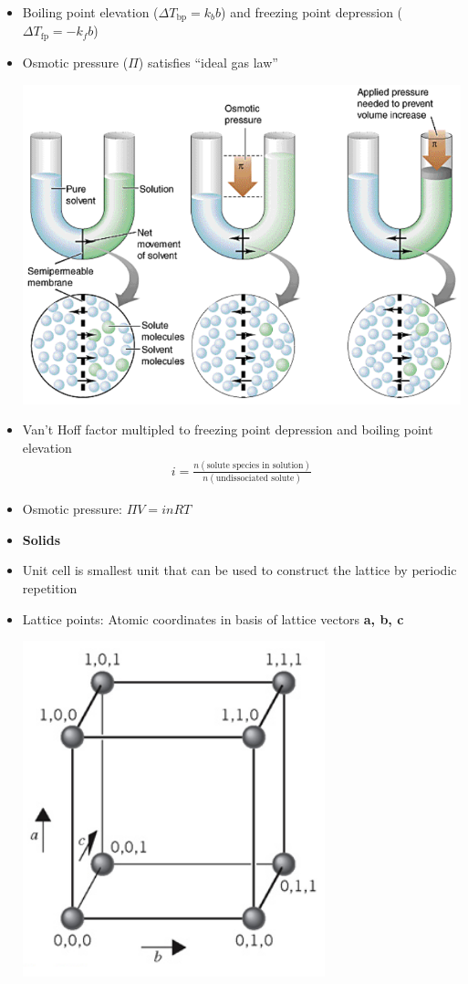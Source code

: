 \documentclass[11pt]{article}
\begin{document}
\begin{itemize}
\item Boiling point elevation ($\Delta T_\text{bp} = k_b b$) and freezing
  point depression ($\Delta T_\text{fp} = -k_fb$)
\item Osmotic pressure ($\Pi$) satisfies ``ideal gas law''
  \begin{center}
    \includegraphics[scale=0.4]{osmotic.png}
  \end{center}
\item Van't Hoff factor multipled to freezing point depression and
  boiling point elevation
  \begin{align*}
    i=\frac{n(\text{solute species in solution})}
    {n(\text{undissociated solute})}
  \end{align*}
\item Osmotic pressure: $\Pi V = inRT$
\item[] \textbf{Solids}
\item Unit cell is smallest unit that can be used to
  construct the lattice by periodic repetition
\item Lattice points: Atomic coordinates in basis
  of lattice vectors \textbf{a, b, c}
  \begin{center}
    \includegraphics[scale=0.4]{solids.png}

\end{center}
\end{itemize}
\end{document}
